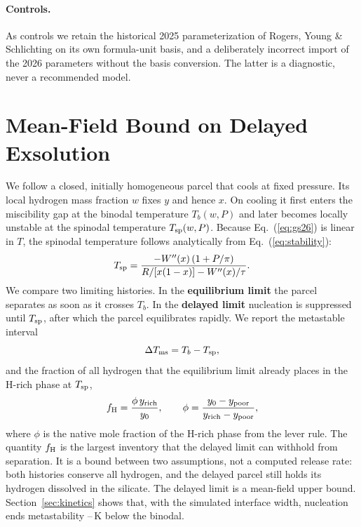 \paragraph{Controls.} As controls we retain the historical 2025 parameterization of Rogers,
Young \& Schlichting \cite{rogers2025} on its own formula-unit basis, and a deliberately
incorrect import of the 2026 parameters without the basis conversion. The latter is a
diagnostic, never a recommended model.

\section{Mean-Field Bound on Delayed Exsolution}\label{sec:delayed}

We follow a closed, initially homogeneous parcel that cools at fixed pressure. Its local
hydrogen mass fraction $w$ fixes $y$ and hence $x$. On cooling it first enters the
miscibility gap at the binodal temperature $T_b(w,P)$ and later becomes locally unstable at
the spinodal temperature $T_{\rm sp}(w,P)$. Because Eq.~(\ref{eq:gs26}) is linear in $T$,
the spinodal temperature follows analytically from Eq.~(\ref{eq:stability}):
\begin{equation}
T_{\rm sp} = \frac{-W''(x)\,(1+P/\pi)}{R/[x(1-x)] - W''(x)/\tau}.
\label{eq:tsp}
\end{equation}
We compare two limiting histories. In the \textbf{equilibrium limit} the parcel separates as
soon as it crosses $T_b$. In the \textbf{delayed limit} nucleation is suppressed until
$T_{\rm sp}$, after which the parcel equilibrates rapidly. We report the metastable interval
\begin{equation}
\Delta T_{\rm ms} = T_b - T_{\rm sp},
\label{eq:interval}
\end{equation}
and the fraction of all hydrogen that the equilibrium limit already places in the H-rich
phase at $T_{\rm sp}$,
\begin{equation}
f_{\rm H} = \frac{\phi\, y_{\rm rich}}{y_0}, \qquad
\phi = \frac{y_0-y_{\rm poor}}{y_{\rm rich}-y_{\rm poor}},
\label{eq:fh}
\end{equation}
where $\phi$ is the native mole fraction of the H-rich phase from the lever rule. The quantity
$f_{\rm H}$ is the largest inventory that the delayed limit can withhold from separation. It is
a bound between two assumptions, not a computed release rate: both histories conserve all
hydrogen, and the delayed parcel still holds its hydrogen dissolved in the silicate. The delayed
limit is a mean-field upper bound. Section~\ref{sec:kinetics} shows that, with the simulated
interface width, nucleation ends metastability \dlyFigOneCPubLo{}--\dlyFigOneCPubHi{}\,K below
the binodal.

